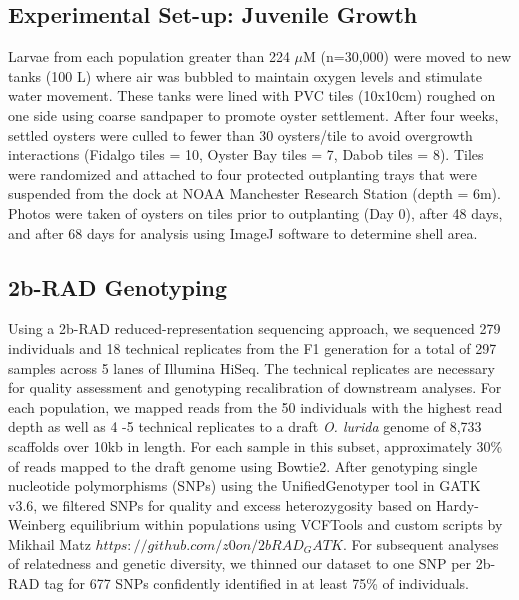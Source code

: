 \documentclass[fleqn,10pt]{wlscirep}
\begin{document}
\subsection*{Experimental Set-up: Juvenile Growth}
Larvae from each population greater than 224 $\mu$M (n=30,000) were moved to new tanks (100 L) where air was bubbled to maintain oxygen levels and stimulate water movement. These tanks were lined with PVC tiles (10x10cm) roughed on one side using coarse sandpaper to promote oyster settlement. After four weeks, settled oysters were culled to fewer than 30 oysters/tile to avoid overgrowth interactions (Fidalgo tiles = 10, Oyster Bay tiles = 7, Dabob tiles = 8). Tiles were randomized and attached to four protected outplanting trays that were suspended from the dock at NOAA Manchester Research Station (depth = 6m). Photos were taken of oysters on tiles prior to outplanting (Day 0), after 48 days, and after 68 days for analysis using ImageJ software to determine shell area. 

\subsection*{2b-RAD Genotyping}
Using a 2b-RAD reduced-representation sequencing approach\cite{Wang2012-nx}, we sequenced 279 individuals and 18 technical replicates from the F1 generation for a total of 297 samples across 5 lanes of Illumina HiSeq. The technical replicates are necessary for quality assessment and genotyping recalibration of downstream analyses. For each population, we mapped reads from the 50 individuals with the highest read depth as well as 4 -5 technical replicates to a draft \textit{O. lurida} genome of 8,733 scaffolds over 10kb in length. For each sample in this subset, approximately 30\% of reads mapped to the draft genome using Bowtie2. After genotyping single nucleotide polymorphisms (SNPs) using the UnifiedGenotyper tool in GATK v3.6\cite{McKenna2010-kq}, we filtered SNPs for quality and excess heterozygosity based on Hardy-Weinberg equilibrium within populations using VCFTools\cite{Danecek2011-lh} and custom scripts by Mikhail Matz \(https://github.com/z0on/2bRAD_GATK\). For subsequent analyses of relatedness and genetic diversity, we thinned our dataset to one SNP per 2b-RAD tag for 677 SNPs confidently identified in at least 75\% of individuals. 
\end{document}
